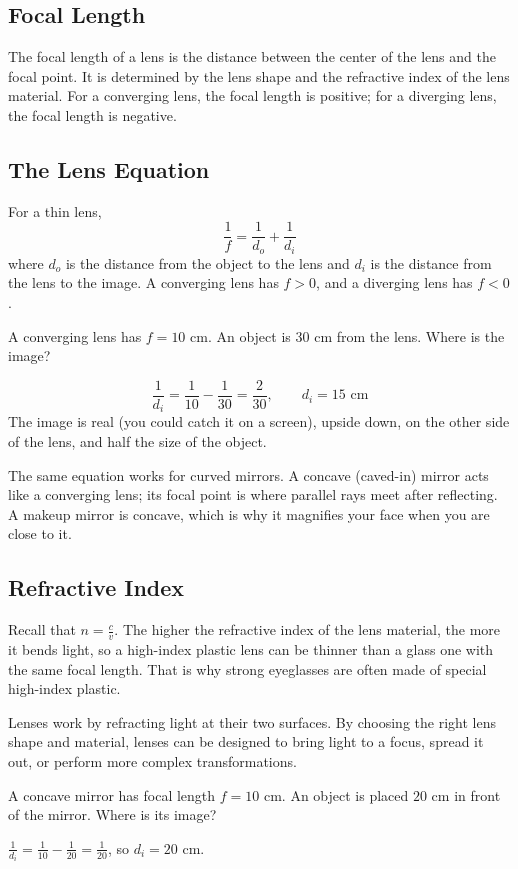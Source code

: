 \subsection{Focal Length}

The focal length of a lens is the distance between the center of the
lens and the focal point. It is determined by the lens shape and the
refractive index of the lens material. For a converging lens, the
focal length is positive; for a diverging lens, the focal length
is negative.

\subsection{The Lens Equation}

For a thin lens,
$$\frac{1}{f} = \frac{1}{d_o} + \frac{1}{d_i}$$
where $d_o$ is the distance from the object to the lens and $d_i$ is the distance from the lens to the image. A converging lens has $f > 0$, and a diverging lens has $f < 0$.

\begin{Worked}
\begin{Problem}
A converging lens has $f = 10$ cm. An object is $30$ cm from the lens. Where is the image?
\end{Problem}
\begin{Solution}
$$\frac{1}{d_i} = \frac{1}{10} - \frac{1}{30} = \frac{2}{30}, \qquad d_i = 15 \text{ cm}$$ The image is real (you could catch it on a screen), upside down, on the
other side of the lens, and half the size of the object.
\end{Solution}
\end{Worked}

The same equation works for curved mirrors. A concave (caved-in) mirror
acts like a converging lens; its focal point is where parallel rays meet
after reflecting. A makeup mirror is concave, which is why it magnifies
your face when you are close to it.

\subsection{Refractive Index}

Recall that $n = \frac{c}{v}$. The higher the
refractive index of the lens material, the more it bends light, so a
high-index plastic lens can be thinner than a glass one with the same focal
length. That is why strong eyeglasses are often made of special high-index
plastic.

Lenses work by refracting light at their two surfaces. By choosing the
right lens shape and material, lenses can be designed to bring light
to a focus, spread it out, or perform more complex transformations.

\begin{Exercise}[title={Object Moved Closer}, label=opt4]
A concave mirror has focal length $f = 10$ cm. An object is placed $20$ cm in front of the mirror. Where is its image?
\end{Exercise}
\begin{Answer}[ref=opt4]
$\frac{1}{d_i} = \frac{1}{10} - \frac{1}{20} = \frac{1}{20}$, so $d_i = 20$ cm.
\end{Answer}
